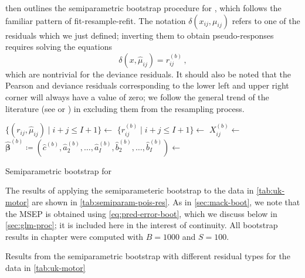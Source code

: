 \documentclass[a4paper]{book}
\begin{document}
 then outlines the semiparametric bootstrap procedure for , which follows the familiar pattern of fit-resample-refit. The notation $\delta(x_{ij}, \mu_{ij})$ refers to one of the residuals which we just defined; inverting them to obtain pseudo-responses requires solving the equations
\begin{equation}
  \delta(x, \widehat{\mu}_{ij}) = r^{(b)}_{ij} \,,
\end{equation}
which are nontrivial for the deviance residuals. It should also be noted that the Pearson and deviance residuals corresponding to the lower left and upper right corner will always have a value of zero; we follow the general trend of the literature (see \cite[706]{pinheiro} or \cite[6]{verdonck}) in excluding them from the resampling process.

\begin{algorithm}
  \begin{algorithmic}
    \State $\{(r_{ij}, \widehat{\mu}_{ij}) \mid i + j \leq I + 1 \} \gets$ 
      \State $\{r^{(b)}_{ij} \mid i + j \leq I + 1 \} \gets$ 
          \State $X_{ij}^{(b)} \gets$ 
        \EndFor
      \EndFor
      \State $\widehat{\bm{\beta}}^{(b)} \coloneqq (\widehat{c}^{(b)}, \widehat{a}_2^{(b)}, \dots, \widehat{a}_I^{(b)}, \widehat{b}_2^{(b)}, \dots, \widehat{b}_I^{(b)}) \gets$ 
    \EndFor
    \State {}
  \end{algorithmic}
  \caption{Semiparametric bootstrap for }
  \label{alg:semiparam-pois}
\end{algorithm}

The results of applying the semiparameteric bootstrap to the data in \cref{tab:uk-motor} are shown in \cref{tab:semiparam-pois-res}. As in \cref{sec:mack-boot}, we note that the MSEP is obtained using \cref{eq:pred-error-boot}, which we discuss below in \cref{sec:glm-proc}; it is included here in the interest of continuity. All bootstrap results in chapter were computed with $B = 1000$ and $S = 100$. 

\begin{table}
  \begin{subtable}{0.5\linewidth}
    
  \end{subtable}
  \hfill
  \begin{subtable}{0.5\linewidth}
    
  \end{subtable}
  \caption{Results from the semiparametric bootstrap with different residual types for the data in \cref{tab:uk-motor}}
  \label{tab:semiparam-pois-res}
\end{table}
\end{document}
